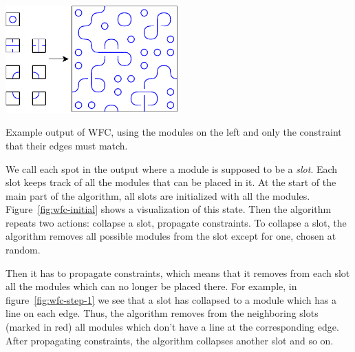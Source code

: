 \begin{center}
    \captionsetup{type=figure}
    \includegraphics[width=0.5\textwidth]{img/WFC modules.pdf}
    \caption{Example output of WFC, using the modules on the left and only the constraint that their edges must match.}
    \label{fig:wfc-modules}
\end{center}

We call each spot in the output where a module is supposed to be a \emph{slot}.
Each slot keeps track of all the modules that can be placed in it.
At the start of the main part of the algorithm, all slots are initialized with all the modules.
Figure~\ref{fig:wfc-initial} shows a visualization of this state.
Then the algorithm repeats two actions: collapse a slot, propagate constraints.
To collapse a slot, the algorithm removes all possible modules from the slot except for one, chosen at random.

Then it has to propagate constraints, which means that it removes from each slot all the modules which can no longer be placed there.
For example, in figure~\ref{fig:wfc-step-1} we see that a slot has collapsed to a module which has a line on each edge.
Thus, the algorithm removes from the neighboring slots (marked in red) all modules which don't have a line at the corresponding edge.
After propagating constraints, the algorithm collapses another slot and so on.

